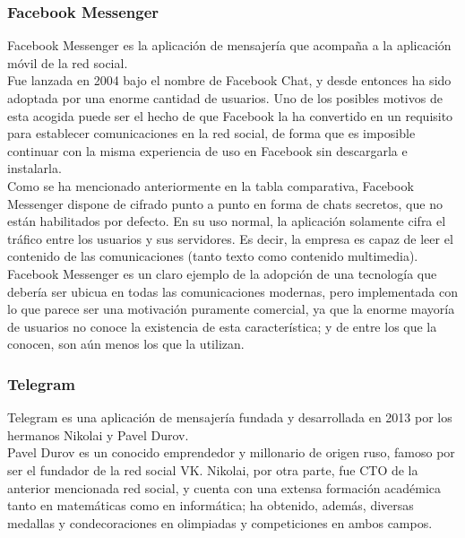 \subsubsection {Facebook Messenger}

Facebook Messenger es la aplicación de mensajería que acompaña a la aplicación móvil de la red social. \\

Fue lanzada en 2004 bajo el nombre de Facebook Chat, y desde entonces ha sido adoptada por una enorme cantidad de usuarios. Uno de los posibles motivos de esta acogida puede ser el hecho de que Facebook la ha convertido en un requisito para establecer comunicaciones en la red social, de forma que es imposible continuar con la misma experiencia de uso en Facebook sin descargarla e instalarla. \\

Como se ha mencionado anteriormente en la tabla comparativa, Facebook Messenger dispone de cifrado punto a punto en forma de chats secretos, que no están habilitados por defecto. En su uso normal, la aplicación solamente cifra el tráfico entre los usuarios y sus servidores. Es decir, la empresa es capaz de leer el contenido de las comunicaciones (tanto texto como contenido multimedia). \\

Facebook Messenger es un claro ejemplo de la adopción de una tecnología que debería ser ubicua en todas las comunicaciones modernas, pero implementada con lo que parece ser una motivación puramente comercial, ya que la enorme mayoría de usuarios no conoce la existencia de esta característica; y de entre los que la conocen, son aún menos los que la utilizan. \cite{FacebookEncrypt} \cite{FacebookHowToEncrypt}

\subsubsection {Telegram}

Telegram es una aplicación de mensajería fundada y desarrollada en 2013 por los hermanos Nikolai y Pavel Durov. \\

Pavel Durov es un conocido emprendedor y millonario de origen ruso, famoso por ser el fundador de la red social VK. Nikolai, por otra parte, fue CTO de la anterior mencionada red social, y cuenta con una extensa formación académica tanto en matemáticas como en informática; ha obtenido, además, diversas medallas y condecoraciones en olimpiadas y competiciones en ambos campos. \\


